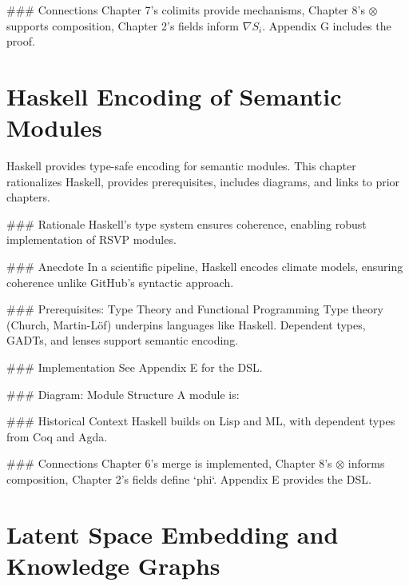 \documentclass[12pt]{article}
\begin{document}
{### Connections
Chapter 7’s colimits provide mechanisms, Chapter 8’s $\otimes$ supports composition, Chapter 2’s fields inform $\nabla S_i$. Appendix G includes the proof.

\section{Haskell Encoding of Semantic Modules}
\label{sec:chapter10}

Haskell provides type-safe encoding for semantic modules. This chapter rationalizes Haskell, provides prerequisites, includes diagrams, and links to prior chapters.

### Rationale
Haskell’s type system ensures coherence, enabling robust implementation of RSVP modules.

### Anecdote
In a scientific pipeline, Haskell encodes climate models, ensuring coherence unlike GitHub’s syntactic approach.

### Prerequisites: Type Theory and Functional Programming
Type theory (Church, Martin-Löf) underpins languages like Haskell. Dependent types, GADTs, and lenses support semantic encoding.

### Implementation
See Appendix E for the DSL.

### Diagram: Module Structure
A module is:

\begin{center}
\end{center}

### Historical Context
Haskell builds on Lisp and ML, with dependent types from Coq and Agda.

### Connections
Chapter 6’s merge is implemented, Chapter 8’s $\otimes$ informs composition, Chapter 2’s fields define `phi`. Appendix E provides the DSL.

\section{Latent Space Embedding and Knowledge Graphs}
\label{sec:chapter11}

}
\end{document}
